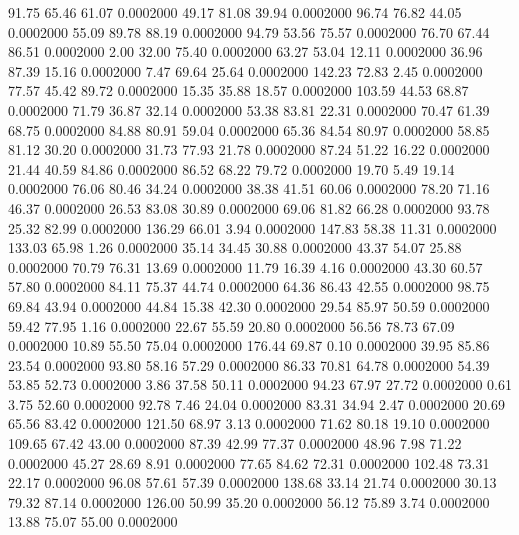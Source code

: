   91.75   65.46   61.07   0.0002000
  49.17   81.08   39.94   0.0002000
  96.74   76.82   44.05   0.0002000
  55.09   89.78   88.19   0.0002000
  94.79   53.56   75.57   0.0002000
  76.70   67.44   86.51   0.0002000
   2.00   32.00   75.40   0.0002000
  63.27   53.04   12.11   0.0002000
  36.96   87.39   15.16   0.0002000
   7.47   69.64   25.64   0.0002000
 142.23   72.83    2.45   0.0002000
  77.57   45.42   89.72   0.0002000
  15.35   35.88   18.57   0.0002000
 103.59   44.53   68.87   0.0002000
  71.79   36.87   32.14   0.0002000
  53.38   83.81   22.31   0.0002000
  70.47   61.39   68.75   0.0002000
  84.88   80.91   59.04   0.0002000
  65.36   84.54   80.97   0.0002000
  58.85   81.12   30.20   0.0002000
  31.73   77.93   21.78   0.0002000
  87.24   51.22   16.22   0.0002000
  21.44   40.59   84.86   0.0002000
  86.52   68.22   79.72   0.0002000
  19.70    5.49   19.14   0.0002000
  76.06   80.46   34.24   0.0002000
  38.38   41.51   60.06   0.0002000
  78.20   71.16   46.37   0.0002000
  26.53   83.08   30.89   0.0002000
  69.06   81.82   66.28   0.0002000
  93.78   25.32   82.99   0.0002000
 136.29   66.01    3.94   0.0002000
 147.83   58.38   11.31   0.0002000
 133.03   65.98    1.26   0.0002000
  35.14   34.45   30.88   0.0002000
  43.37   54.07   25.88   0.0002000
  70.79   76.31   13.69   0.0002000
  11.79   16.39    4.16   0.0002000
  43.30   60.57   57.80   0.0002000
  84.11   75.37   44.74   0.0002000
  64.36   86.43   42.55   0.0002000
  98.75   69.84   43.94   0.0002000
  44.84   15.38   42.30   0.0002000
  29.54   85.97   50.59   0.0002000
  59.42   77.95    1.16   0.0002000
  22.67   55.59   20.80   0.0002000
  56.56   78.73   67.09   0.0002000
  10.89   55.50   75.04   0.0002000
 176.44   69.87    0.10   0.0002000
  39.95   85.86   23.54   0.0002000
  93.80   58.16   57.29   0.0002000
  86.33   70.81   64.78   0.0002000
  54.39   53.85   52.73   0.0002000
   3.86   37.58   50.11   0.0002000
  94.23   67.97   27.72   0.0002000
   0.61    3.75   52.60   0.0002000
  92.78    7.46   24.04   0.0002000
  83.31   34.94    2.47   0.0002000
  20.69   65.56   83.42   0.0002000
 121.50   68.97    3.13   0.0002000
  71.62   80.18   19.10   0.0002000
 109.65   67.42   43.00   0.0002000
  87.39   42.99   77.37   0.0002000
  48.96    7.98   71.22   0.0002000
  45.27   28.69    8.91   0.0002000
  77.65   84.62   72.31   0.0002000
 102.48   73.31   22.17   0.0002000
  96.08   57.61   57.39   0.0002000
 138.68   33.14   21.74   0.0002000
  30.13   79.32   87.14   0.0002000
 126.00   50.99   35.20   0.0002000
  56.12   75.89    3.74   0.0002000
  13.88   75.07   55.00   0.0002000
